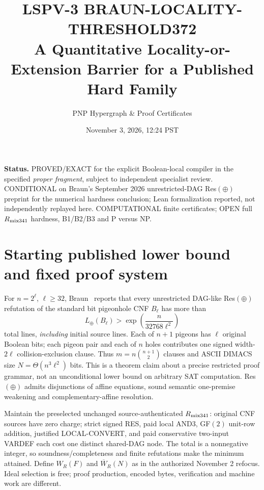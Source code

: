 \documentclass[11pt]{article}
\title{LSPV-3 BRAUN-LOCALITY-THRESHOLD372\\ A Quantitative Locality-or-Extension Barrier for a Published Hard Family}
\author{PNP Hypergraph \& Proof Certificates}
\date{November 3, 2026, 12:24 PST}
\begin{document}
\maketitle
\noindent\textbf{Status.} PROVED/EXACT for the explicit Boolean-local compiler in the specified \emph{proper fragment}, subject to independent specialist review. CONDITIONAL on Braun's September 2026 unrestricted-DAG Res$(\oplus)$ preprint for the numerical hardness conclusion; Lean formalization reported, not independently replayed here. COMPUTATIONAL finite certificates; OPEN full $R_{\rm mix341}$ hardness, B1/B2/B3 and P versus NP.

\section*{Starting published lower bound and fixed proof system}
For $n=2^\ell$, $\ell\ge32$, Braun~\cite{Braun} reports that every unrestricted DAG-like Res$(\oplus)$ refutation of the standard bit pigeonhole CNF $B_\ell$ has more than
\[
L_\oplus(B_\ell)>\exp\left(\frac{n}{32768\ell^2}\right)
\]
total lines, \emph{including} initial source lines. Each of $n+1$ pigeons has $\ell$ original Boolean bits; each pigeon pair and each of $n$ holes contributes one signed width-$2\ell$ collision-exclusion clause. Thus $m=n\binom{n+1}{2}$ clauses and ASCII DIMACS size $N=\Theta(n^3\ell^2)$ bits. This is a theorem claim about a precise restricted proof grammar, not an unconditional lower bound on arbitrary SAT computation. Res$(\oplus)$ admits disjunctions of affine equations, sound semantic one-premise weakening and complementary-affine resolution.

Maintain the preselected unchanged source-authenticated $R_{\rm mix341}$: original CNF sources have zero charge; strict signed RES, paid local AND3, GF$(2)$ unit-row addition, justified LOCAL-CONVERT, and paid conservative two-input VARDEF each cost one distinct shared-DAG node. The total is a nonnegative integer, so soundness/completeness and finite refutations make the minimum attained. Define $W_R(F)$ and $\overline W_R(N)$ as in the authorized November 2 refocus. Ideal selection is free; proof production, encoded bytes, verification and machine work are different.
\end{document}
